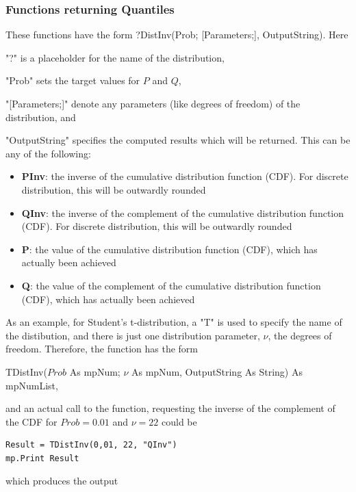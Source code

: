 \newpage
\subsubsection{Functions returning Quantiles}
\label{Functions returning Quantiles}
These functions have the form \textsf{?DistInv(Prob; [Parameters;], OutputString)}.
Here 

"?" is a placeholder for the name of the distribution, 

"Prob" sets the target values for $P$ and $Q$, 

"[Parameters;]" denote any parameters (like degrees of freedom) of the distribution, and 

"OutputString" specifies the computed results which will be returned. This can be any of the following:

\begin{itemize}
	\item \textbf{PInv}: the inverse of the cumulative distribution function (CDF). For discrete distribution, this will be outwardly rounded
	\item \textbf{QInv}: the inverse of the complement of the cumulative distribution function (CDF). For discrete distribution, this will be outwardly rounded
	\item \textbf{P}: the value of the cumulative distribution function (CDF), which has actually been achieved
	\item \textbf{Q}: the value of the complement of the cumulative distribution function (CDF), which has actually been achieved
\end{itemize}


\vspace{0.3cm}
As an example, for Student's t-distribution, a "T" is used to specify the name of the distibution, and there is just one distribution parameter, $\nu$, the degrees of freedom. Therefore,  the function has the form

\vspace{0.3cm}
\textsf{TDistInv($Prob$ As mpNum; $\nu$ As mpNum, OutputString As String) As mpNumList}, 

\vspace{0.3cm}
and an actual call to the function, requesting the inverse of the complement of the CDF for $Prob=0.01$ and $\nu=22$ could be

\begin{lstlisting}
Result = TDistInv(0,01, 22, "QInv")
mp.Print Result
\end{lstlisting}
which produces the output

